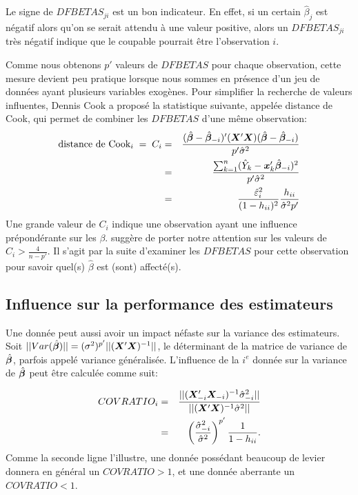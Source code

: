 Le signe de $DFBETAS_{ji}$ est un bon indicateur. En effet, si un certain $\hat\beta_j$ est négatif alors qu'on se serait attendu à une valeur positive, alors un $DFBETAS_{ji}$ très négatif indique que le \og coupable \fg pourrait être l'observation $i$.

Comme nous obtenons $p\prime$ valeurs de $DFBETAS$
pour chaque observation, cette mesure devient peu pratique lorsque
nous sommes en présence d'un jeu de données ayant plusieurs
variables exogènes. Pour simplifier la recherche de valeurs influentes, Dennis Cook a proposé la statistique suivante, appelée distance
de Cook, qui permet de combiner les $DFBETAS$ d'une m\^eme observation:
\begin{eqnarray*}
\text{distance de Cook}_i\;=\;C_i & = & {(\hat{\bm\beta}-\hat{\bm\beta}_{-i})'(\bm{X}'\bm{X})(\hat{\bm\beta}-\hat{\bm\beta}_{-i})
\over p' \hat\sigma^2} \\
& = & \frac{\sum_{k=1}^n(\hat Y_k-{\bm{x}}_k'\hat{\bm\beta}_{-i})^2}{p'\hat\sigma^2} \\
& = & \frac{\hat\varepsilon_i^2}{(1-h_{ii})^2}\frac{h_{ii}}{\hat\sigma^2 p'} \\
\end{eqnarray*}
 Une grande valeur de $C_i$ indique une observation
ayant une influence prépondérante sur les $\beta$. \citet{Fox:91} suggère de porter notre attention sur les valeurs de $C_i>\frac{4}{n-p'}$. Il s'agit par la suite
d'examiner les $DFBETAS$ pour cette observation pour savoir quel(s)
$\hat\beta$ est (sont) affecté(s).


\subsection{Influence sur la performance des estimateurs}
Une donnée peut aussi avoir un impact néfaste sur la variance des estimateurs. Soit $||Var(\hat{\bm\beta})|| = (\sigma^2)^{p'}||(\bm{X}'\bm{X})^{-1}||$, le déterminant de la matrice de variance de $\hat{\bm\beta}$, parfois appelé variance généralisée. L'influence de la $i^e$ donnée sur la variance de $\hat{\bm\beta}$ peut \^etre calculée comme suit:

\begin{eqnarray*}COVRATIO_i&=&{||(\bm{X}_{-i}'\bm{X}_{-i})^{-1}\hat\sigma_{-i}^2||
\over||(\bm{X}'\bm{X})^{-1}\hat\sigma^2||}\\
&=&\left({\hat\sigma_{-i}^{2}\over
\hat\sigma^{2}}\right)^{p'}\frac{1}{1-h_{ii}}.\end{eqnarray*}
Comme la seconde ligne l'illustre, une donnée possédant beaucoup de levier
donnera en général un $COVRATIO>1$, et une donnée aberrante un $COVRATIO<1$.

